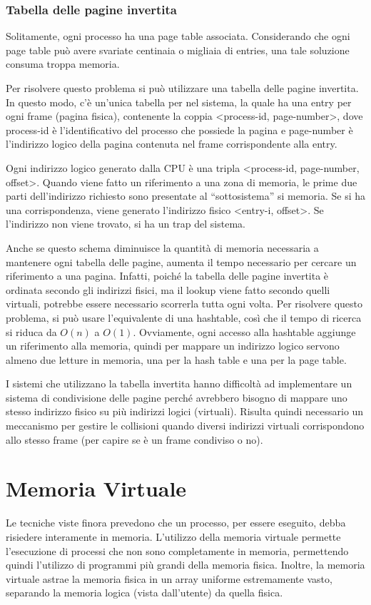 \documentclass[a4]{article}
\begin{document}
\subsubsection{Tabella delle pagine invertita}
Solitamente, ogni processo ha una page table associata. Considerando che ogni page table può avere svariate centinaia o migliaia di entries, una tale soluzione consuma troppa memoria.

Per risolvere questo problema si può utilizzare una tabella delle pagine invertita. In questo modo, c'è un'unica tabella per nel sistema, la quale ha una entry per ogni frame (pagina fisica), contenente la coppia <process-id, page-number>, dove process-id è l'identificativo del processo che possiede la pagina e page-number è l'indirizzo logico della pagina contenuta nel frame corrispondente alla entry.

Ogni indirizzo logico generato dalla CPU è una tripla <process-id, page-number, offset>. Quando viene fatto un riferimento a una zona di memoria, le prime due parti dell'indirizzo richiesto sono presentate al ``sottosistema'' si memoria. Se si ha una corrispondenza, viene generato l'indirizzo fisico <entry-i, offset>. Se l'indirizzo non viene trovato, si ha un trap del sistema.

Anche se questo schema diminuisce la quantità di memoria necessaria a mantenere ogni tabella delle pagine, aumenta il tempo necessario per cercare un riferimento a una pagina. Infatti, poiché la tabella delle pagine invertita è ordinata secondo gli indirizzi fisici, ma il lookup viene fatto secondo quelli virtuali, potrebbe essere necessario scorrerla tutta ogni volta. Per risolvere questo problema, si può usare l'equivalente di una hashtable, così che il tempo di ricerca si riduca da $O(n)$ a $O(1)$. Ovviamente, ogni accesso alla hashtable aggiunge un riferimento alla memoria, quindi per mappare un indirizzo logico servono almeno due letture in memoria, una per la hash table e una per la page table.

I sistemi che utilizzano la tabella invertita hanno difficoltà ad implementare un sistema di condivisione delle pagine perché avrebbero bisogno di mappare uno stesso indirizzo fisico su più indirizzi logici (virtuali). Risulta quindi necessario un meccanismo per gestire le collisioni quando diversi indirizzi virtuali corrispondono allo stesso frame (per capire se è un frame condiviso o no).


\section{Memoria Virtuale}
Le tecniche viste finora prevedono che un processo, per essere eseguito, debba risiedere interamente in memoria. L'utilizzo della memoria virtuale permette l'esecuzione di processi che non sono completamente in memoria, permettendo quindi l'utilizzo di programmi più grandi della memoria fisica. Inoltre, la memoria virtuale astrae la memoria fisica in un array uniforme estremamente vasto, separando la memoria logica (vista dall'utente) da quella fisica.
\end{document}
